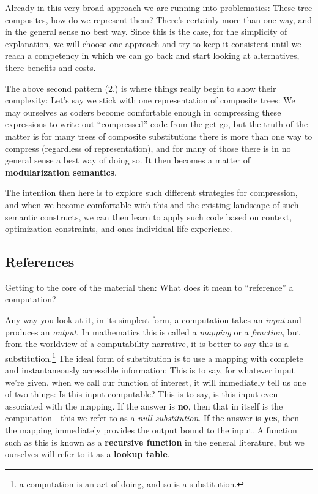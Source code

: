 \documentclass[twoside]{article}
\begin{document}
Already in this very broad approach we are running into problematics: These tree composites, how do we represent them? There's
certainly more than one way, and in the general sense no best way. Since this is the case, for the simplicity of explanation,
we will choose one approach and try to keep it consistent until we reach a competency in which we can go back and start looking
at alternatives, there benefits and costs.

The above second pattern ($ 2. $) is where things really begin to show their complexity: Let's say we stick with one representation
of composite trees: We may ourselves as coders become comfortable enough in compressing these expressions to write out ``compressed''
code from the get-go, but the truth of the matter is for many trees of composite substitutions there is more than one way to compress
(regardless of representation), and for many of those there is in no general sense a best way of doing so. It then becomes a matter
of {\bfseries modularization semantics}.

The intention then here is to explore such different strategies for compression, and when we become comfortable with this and the
existing landscape of such semantic constructs, we can then learn to apply such code based on context, optimization constraints,
and ones individual life experience.

\subsection*{References}

Getting to the core of the material then: What does it mean to ``reference'' a computation?

Any way you look at it, in its simplest form, a computation takes an \emph{input} and produces an \emph{output}. In mathematics
this is called a \emph{mapping} or a \emph{function}, but from the worldview of a computability narrative, it is better to say this
is a substitution.\footnote{a computation is an act of doing, and so is a substitution.} The ideal form of substitution is to use
a mapping with complete and instantaneously accessible information: This is to say, for whatever input we're given, when we call
our function of interest, it will immediately tell us one of two things: Is this input computable? This is to say, is this input
even associated with the mapping. If the answer is {\bfseries no}, then that in itself is the computation---this we refer to as a
\emph{null substitution}. If the answer is {\bfseries yes}, then the mapping immediately provides the output bound to the input.
A function such as this is known as a {\bfseries recursive function} in the general literature, but we ourselves will refer to it
as a {\bfseries lookup table}.
\end{document}
